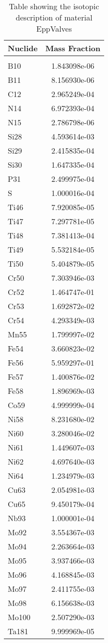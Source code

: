\begin{centering}
\begin{table}[ht!]
\begin{tabular}{l | c}
\hline
Nuclide & Mass Fraction\\
\hline
\\
B10 & 1.843098e-06\\
B11 & 8.156930e-06\\
C12 & 2.965249e-04\\
N14 & 6.972393e-04\\
N15 & 2.786798e-06\\
Si28 & 4.593614e-03\\
Si29 & 2.415835e-04\\
Si30 & 1.647335e-04\\
P31 & 2.499975e-04\\
S & 1.000016e-04\\
Ti46 & 7.920085e-05\\
Ti47 & 7.297781e-05\\
Ti48 & 7.381413e-04\\
Ti49 & 5.532184e-05\\
Ti50 & 5.404879e-05\\
Cr50 & 7.303946e-03\\
Cr52 & 1.464747e-01\\
Cr53 & 1.692872e-02\\
Cr54 & 4.293349e-03\\
Mn55 & 1.799997e-02\\
Fe54 & 3.660823e-02\\
Fe56 & 5.959297e-01\\
Fe57 & 1.400876e-02\\
Fe58 & 1.896969e-03\\
Co59 & 4.999999e-04\\
Ni58 & 8.231680e-02\\
Ni60 & 3.280046e-02\\
Ni61 & 1.449607e-03\\
Ni62 & 4.697640e-03\\
Ni64 & 1.234979e-03\\
Cu63 & 2.054981e-03\\
Cu65 & 9.450179e-04\\
Nb93 & 1.000001e-04\\
Mo92 & 3.554367e-03\\
Mo94 & 2.263664e-03\\
Mo95 & 3.937466e-03\\
Mo96 & 4.168845e-03\\
Mo97 & 2.411755e-03\\
Mo98 & 6.156638e-03\\
Mo100 & 2.507290e-03\\
Ta181 & 9.999969e-05
\end{tabular}
\caption{Table showing the isotopic description of material EppValves}
\label{table:material_EppValves}
\end{table}\clearpage


\end{centering}

